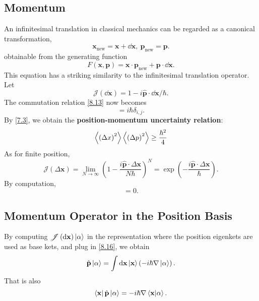 \documentclass{article}
\theoremstyle{1}
\begin{document}
\subsection{Momentum}
An infinitesimal translation in classical mechanics can be regarded as a canonical transformation,
\begin{equation}
    \mathbf{x}_{\text{new}}=\mathbf{x}+\dd{\mathbf{x}},\ \mathbf{p}_{\text{new}}=\mathbf{p}.
\end{equation}
obtainable from the generating function
\begin{equation}
    F(\mathbf{x},\mathbf{p})=\mathbf{x}\cdot\mathbf{p}_{\text{new}}+\mathbf{p}\cdot\dd{\mathbf{x}}.
\end{equation}
This equation has a striking similarity to the infinitesimal translation operator. Let 
\begin{equation}\label{8.16}
    \mathscr{J}(\dd{\mathbf{x}})=1-i\hat{\mathbf{p}}\cdot\dd{\mathbf{x}}/\hbar. 
\end{equation}
The commutation relation \eqref{8.13} now becomes
\begin{equation}
    [\hat{x}_i,\hat{p}_j]=i\hbar\delta_{i,j}.
\end{equation}
By \eqref{7.3}, we obtain the \textbf{position-momentum uncertainty relation}:
\begin{equation}
    \expval{\left(\Delta x\right)^2}\expval{\left(\Delta p\right)^2}\ge\frac{\hbar^2}{4}
\end{equation}
As for finite position, 
\begin{equation}
    \mathscr{J}(\Delta \mathbf{x})=\lim_{N\rightarrow \infty}\left(1-\frac{i\hat{\mathbf{p}}\cdot\Delta\mathbf{x}}{N\hbar}\right)^N=\exp\left(-\frac{i\hat{\mathbf{p}}\cdot\Delta \mathbf{x}}{\hbar}\right).
\end{equation}
By computation,
\begin{equation}
    [\hat{p}_i,\hat{p}_j]=0.
\end{equation}
\subsection{Momentum Operator in the Position Basis}
By computing $\mathscr{J}\left(\dd{\mathbf{x}}\right)\ket{\alpha}$ in
the representation where the position eigenkets are used as base kets, and plug in \eqref{8.16}, we obtain 
\begin{equation}
    \hat{\mathbf{p}}\ket{\alpha}=\int \dd{\mathbf{x}}\ket{\mathbf{x}}\left(-i\hbar\nabla\ket{\alpha}\right).
\end{equation}
That is also 
\begin{equation}\label{8.23}
    \bra{\mathbf{x}}\hat{\mathbf{p}}\ket{\alpha}=-i\hbar\nabla\braket{\mathbf{x}}{\alpha}.
\end{equation}
\end{document}
